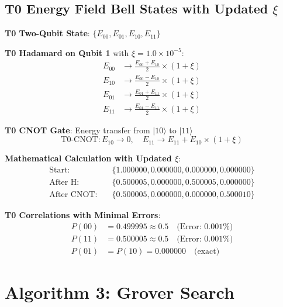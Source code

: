 \documentclass[12pt,a4paper]{article}
\newcommand{\Efield}{E}
\begin{document}
	\subsection{T0 Energy Field Bell States with Updated $\xi$}
	
	\textbf{T0 Two-Qubit State}: $\{\Efield_{00}, \Efield_{01}, \Efield_{10}, \Efield_{11}\}$
	
	\textbf{T0 Hadamard on Qubit 1} with $\xi = 1.0 \times 10^{-5}$:
	\begin{align}
		\Efield_{00} &\rightarrow \frac{\Efield_{00} + \Efield_{10}}{2} \times (1 + \xi) \\
		\Efield_{10} &\rightarrow \frac{\Efield_{00} - \Efield_{10}}{2} \times (1 + \xi) \\
		\Efield_{01} &\rightarrow \frac{\Efield_{01} + \Efield_{11}}{2} \times (1 + \xi) \\
		\Efield_{11} &\rightarrow \frac{\Efield_{01} - \Efield_{11}}{2} \times (1 + \xi)
	\end{align}
	
	\textbf{T0 CNOT Gate}: Energy transfer from $|10\rangle$ to $|11\rangle$
	\begin{equation}
		\text{T0-CNOT}: \Efield_{10} \rightarrow 0, \quad \Efield_{11} \rightarrow \Efield_{11} + \Efield_{10} \times (1 + \xi)
	\end{equation}
	
	\textbf{Mathematical Calculation with Updated $\xi$}:
	\begin{align}
		\text{Start}: \quad &\{1.000000, 0.000000, 0.000000, 0.000000\} \\
		\text{After H}: \quad &\{0.500005, 0.000000, 0.500005, 0.000000\} \\
		\text{After CNOT}: \quad &\{0.500005, 0.000000, 0.000000, 0.500010\}
	\end{align}
	
	\textbf{T0 Correlations with Minimal Errors}:
	\begin{align}
		P(00) &= 0.499995 \approx 0.5 \quad \text{(Error: 0.001\%)} \\
		P(11) &= 0.500005 \approx 0.5 \quad \text{(Error: 0.001\%)} \\
		P(01) &= P(10) = 0.000000 \quad \text{(exact)}
	\end{align}
	
	\section{Algorithm 3: Grover Search}
	
\end{document}
